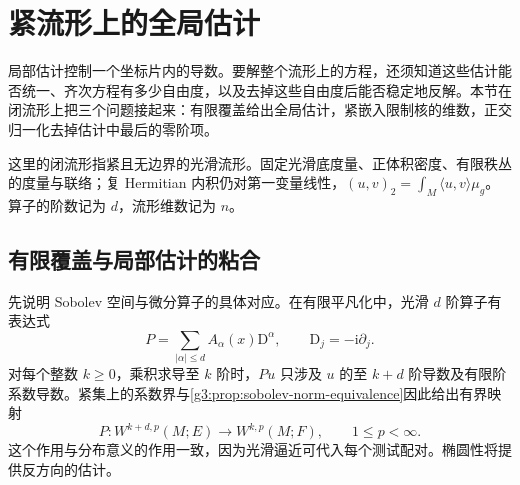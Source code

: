 
% 
% 

\section{紧流形上的全局估计}
\label{g3:sec:1301}

局部估计控制一个坐标片内的导数。要解整个流形上的方程，还须知道这些估计能否统一、齐次方程有多少自由度，以及去掉这些自由度后能否稳定地反解。本节在闭流形上把三个问题接起来：有限覆盖给出全局估计，紧嵌入限制核的维数，正交归一化去掉估计中最后的零阶项。

\ProseParagraphBreak

这里的闭流形指紧且无边界的光滑流形。固定光滑底度量、正体积密度、有限秩丛的度量与联络；复 Hermitian 内积仍对第一变量线性，\((u,v)_2=\int_M\langle u,v\rangle\mu_g\)。算子的阶数记为 \(d\)，流形维数记为 \(n\)。

\subsection{有限覆盖与局部估计的粘合}
\label{g3:subsec:1301:01}
先说明 Sobolev 空间与微分算子的具体对应。在有限平凡化中，光滑 \(d\) 阶算子有表达式
\[
	P=\sum_{|\alpha|\le d}A_\alpha(x)\mathrm D^\alpha,
	\qquad \mathrm D_j=-\mathrm i\partial_j.
\]
对每个整数 \(k\ge0\)，乘积求导至 \(k\) 阶时，\(Pu\) 只涉及 \(u\) 的至 \(k+d\) 阶导数及有限阶系数导数。紧集上的系数界与\cref{g3:prop:sobolev-norm-equivalence}因此给出有界映射
\[
	P:W^{k+d,p}(M;E)\longrightarrow W^{k,p}(M;F),\qquad1\le p<\infty.
\]
这个作用与分布意义的作用一致，因为光滑逼近可代入每个测试配对。椭圆性将提供反方向的估计。

